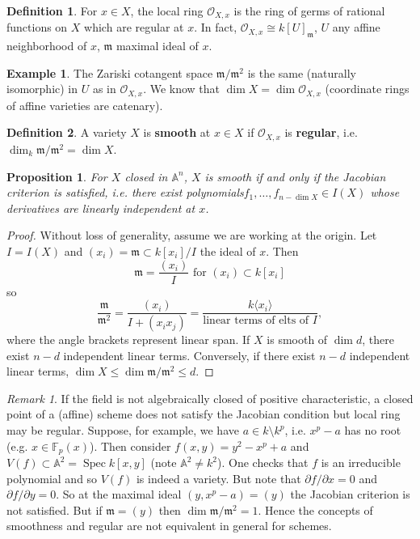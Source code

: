 \documentclass{article}
\newcommand{\F}{\mathbb{F}}
\newcommand{\fr}{\mathfrak}
\newcommand{\A}{\mathbb{A}}
\DeclareMathOperator{\Spec}{Spec}
\theoremstyle{plain}
\newtheorem{prop}[thm]{Proposition}
\theoremstyle{definition}
\newtheorem{defn}{Definition}
\newtheorem{exmp}{Example}
\theoremstyle{remark}
\newtheorem*{rem}{Remark}
\begin{document}
\begin{defn}
    For $x\in X$, the local ring $\mathcal{O}_{X,x}$ is the ring of 
    germs of rational functions on $X$ which are regular at $x$.
    In fact, $\mathcal{O}_{X,x}\cong k[U]_{\fr m}$, $U$ any affine neighborhood
    of $x$, $\fr m$ maximal ideal of $x$.
\end{defn}

\begin{exmp}
    The Zariski cotangent space $\fr m/\fr m^2$ is the same (naturally isomorphic)
    in $U$ as in $\mathcal{O}_{X,x}$. We know that $\dim X=\dim \mathcal{O}_{X,x}$
    (coordinate rings of affine varieties are catenary).
\end{exmp}

\begin{defn}
    A variety $X$ is \textbf{smooth} at $x\in X$ if $\mathcal{O}_{X,x}$ is
    \textbf{regular}, i.e. $\dim_k\fr m/\fr m^2=\dim X$.
\end{defn}

\begin{prop}
    For $X$ closed in $\A^n$, $X$ is smooth if and only if the Jacobian
    criterion is satisfied, i.e. there exist polynomials$f_1,\ldots,f_{n-\dim X}\in I(X)$
    whose derivatives are linearly independent at $x$.
\end{prop}
\begin{proof}
    Without loss of generality, assume we are working at the origin. Let $I=I(X)$ and
    $(x_i)=\fr m\subset k[x_i]/I$ the ideal of $x$. Then
    \[\fr m=\frac{(x_i)}{I} \text{ for }(x_i)\subset k[x_i]\]
    so
    \[\frac{\fr m}{\fr m^2}=\frac{(x_i)}{I+(x_ix_j)}=\frac{k\langle x_i\rangle}{\text{linear terms of elts of }I},\]
    where the angle brackets represent linear span. If $X$ is smooth of $\dim d$,
    there exist $n-d$ independent linear terms. Conversely, if there exist $n-d$ independent linear terms,
    $\dim X\leq \dim\fr m/\fr m^2\leq d$.
\end{proof}

\begin{rem}
    If the field is not algebraically closed of positive characteristic,
    a closed point of a (affine) scheme does not satisfy the Jacobian condition
    but local ring may be regular. Suppose, for example,
    we have $a\in k\setminus k^p$, i.e. $x^p-a$ has no root (e.g. $x\in\F_p(x)$).
    Then consider $f(x,y)=y^2-x^p+a$ and $V(f)\subset\A^2=\Spec k[x,y]$ (note $\A^2\neq k^2$).
    One checks that $f$ is an irreducible polynomial and so $V(f)$ is indeed a variety.
    But note that $\partial f/\partial x=0$ and $\partial f/\partial y=0$. So at
    the maximal ideal $(y,x^p-a)=(y)$ the Jacobian criterion is not satisfied.
    But if $\fr m=(y)$ then $\dim\fr m/\fr m^2=1$. Hence the concepts of smoothness
    and regular are not equivalent in general for schemes.
\end{rem}
\end{document}
